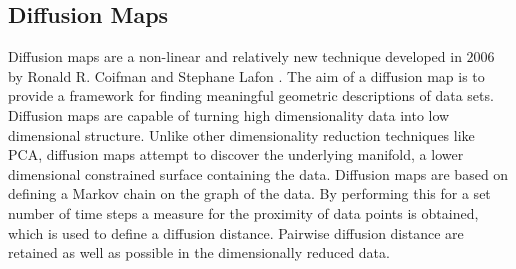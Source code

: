 \subsection{Diffusion Maps}
Diffusion maps are a non-linear and relatively new technique developed in $2006$ by Ronald R. Coifman and Stephane Lafon \cite{Coifman2006}. The aim of a diffusion map is to provide a framework for finding meaningful geometric descriptions of data sets. Diffusion maps are capable of turning high dimensionality data into low dimensional structure. Unlike other dimensionality reduction techniques like PCA, diffusion maps attempt to discover the underlying manifold, a lower dimensional constrained surface containing the data. Diffusion maps are based on defining a Markov chain on the graph of the data. By performing this for a set number of time steps a measure for the proximity of data points is obtained, which is used to define a diffusion distance. Pairwise diffusion distance are retained as well as possible in the dimensionally reduced data.


